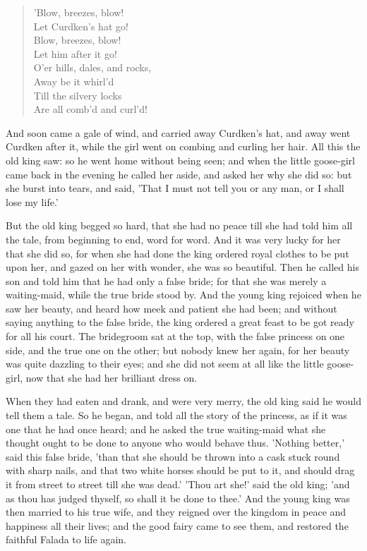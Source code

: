 \documentclass[12pt]{book}
\begin{document}
\begin{verse}
 'Blow, breezes, blow!\\
  Let Curdken's hat go!\\
  Blow, breezes, blow!\\
  Let him after it go!\\
  O'er hills, dales, and rocks,\\
  Away be it whirl'd\\
  Till the silvery locks\\
  Are all comb'd and curl'd!
\end{verse}

And soon came a gale of wind, and carried away Curdken's hat, and away
went Curdken after it, while the girl went on combing and curling her
hair. All this the old king saw: so he went home without being seen;
and when the little goose-girl came back in the evening he called her
aside, and asked her why she did so: but she burst into tears, and
said, 'That I must not tell you or any man, or I shall lose my life.'

But the old king begged so hard, that she had no peace till she had
told him all the tale, from beginning to end, word for word. And it
was very lucky for her that she did so, for when she had done the king
ordered royal clothes to be put upon her, and gazed on her with
wonder, she was so beautiful. Then he called his son and told him that
he had only a false bride; for that she was merely a waiting-maid,
while the true bride stood by. And the young king rejoiced when he saw
her beauty, and heard how meek and patient she had been; and without
saying anything to the false bride, the king ordered a great feast to
be got ready for all his court. The bridegroom sat at the top, with
the false princess on one side, and the true one on the other; but
nobody knew her again, for her beauty was quite dazzling to their
eyes; and she did not seem at all like the little goose-girl, now that
she had her brilliant dress on.

When they had eaten and drank, and were very merry, the old king said
he would tell them a tale. So he began, and told all the story of the
princess, as if it was one that he had once heard; and he asked the
true waiting-maid what she thought ought to be done to anyone who
would behave thus. 'Nothing better,' said this false bride, 'than that
she should be thrown into a cask stuck round with sharp nails, and
that two white horses should be put to it, and should drag it from
street to street till she was dead.' 'Thou art she!' said the old
king; 'and as thou has judged thyself, so shall it be done to thee.'
And the young king was then married to his true wife, and they reigned
over the kingdom in peace and happiness all their lives; and the good
fairy came to see them, and restored the faithful Falada to life
again.
\end{document}
